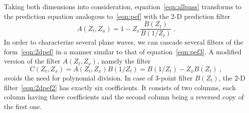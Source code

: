 {Taking both dimensions into consideration,
equation~\ref{eqn:allpass} transforms to the prediction equation
analogous to~\ref{eqn:pef} with the 2-D prediction filter
\begin{equation}
  \label{eqn:2dpef}
  A(Z_t,Z_x) = 1 - Z_x \frac{B(Z_t)}{B(1/Z_t)}\;.
\end{equation}
In order to characterize several plane waves, we can cascade several
filters of the form~\ref{eqn:2dpef} in a manner similar to that of
equation~\ref{eqn:pef3}. A modified version of the filter
$A(Z_t,Z_x)$, namely the filter
\begin{equation}
  \label{eqn:2dpef2}
  C(Z_t,Z_x) = A(Z_t,Z_x) B(1/Z_t) = B(1/Z_t) - Z_x B(Z_t)\;,
\end{equation}
avoids the need for polynomial division. In case of  
3-point filter $B(Z_t)$, the 2-D filter~\ref{eqn:2dpef2} has exactly
six coefficients. It consists of two columns, each column having three
coefficients and the second column being a reversed copy of the first
one.}




